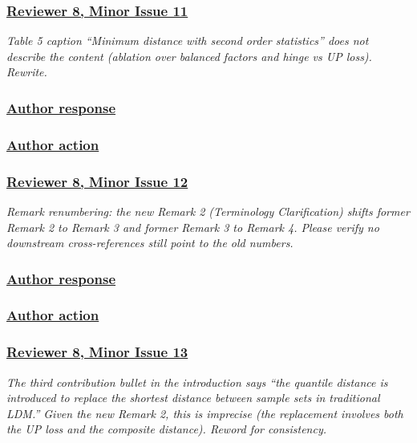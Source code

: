 \documentclass[journal,12pt, onecolumn]{IEEEtran}
\begin{document}
{\color{customgreen}
\subsubsection*{\underline{\textbf{Reviewer 8, Minor Issue 11}}}
\emph{Table 5 caption ``Minimum distance with second order statistics'' does not describe the content (ablation over balanced factors and hinge vs UP loss). Rewrite.}
}


{\color{black}
\subsubsection*{\textbf{\underline{Author response}}}
}


{\color{black}
\subsubsection*{\textbf{\underline{Author action}}}
}


{\color{customgreen}
\subsubsection*{\underline{\textbf{Reviewer 8, Minor Issue 12}}}
\emph{Remark renumbering: the new Remark 2 (Terminology Clarification) shifts former Remark 2 to Remark 3 and former Remark 3 to Remark 4. Please verify no downstream cross-references still point to the old numbers.}
}


{\color{black}
\subsubsection*{\textbf{\underline{Author response}}}
}


{\color{black}
\subsubsection*{\textbf{\underline{Author action}}}
}


{\color{customgreen}
\subsubsection*{\underline{\textbf{Reviewer 8, Minor Issue 13}}}
\emph{The third contribution bullet in the introduction says ``the quantile distance is introduced to replace the shortest distance between sample sets in traditional LDM.'' Given the new Remark 2, this is imprecise (the replacement involves both the UP loss and the composite distance). Reword for consistency.}
}
\end{document}
